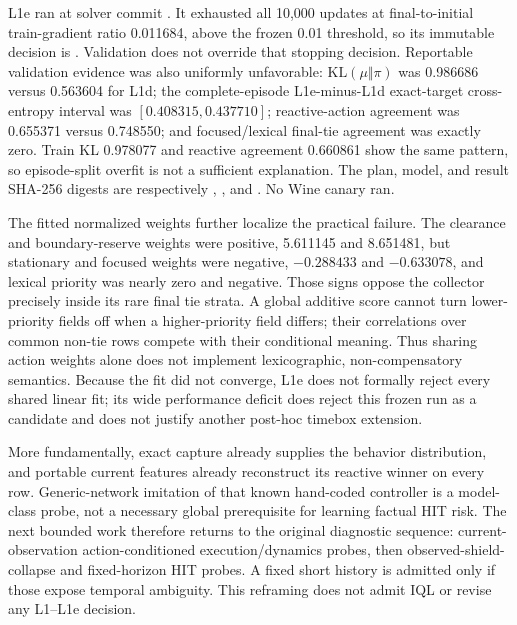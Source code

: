 \documentclass[11pt]{article}
\begin{document}
L1e ran at solver commit
.  It exhausted all 10,000
updates at final-to-initial train-gradient ratio 0.011684, above the frozen
0.01 threshold, so its immutable decision is
.  Validation
does not override that stopping decision.  Reportable validation evidence was
also uniformly unfavorable: $\mathrm{KL}(\mu\Vert\pi)$ was 0.986686 versus
0.563604 for L1d; the complete-episode L1e-minus-L1d exact-target
cross-entropy interval was $[0.408315,0.437710]$; reactive-action agreement was
0.655371 versus 0.748550; and focused/lexical final-tie agreement was exactly
zero.  Train KL 0.978077 and reactive agreement 0.660861 show the same pattern,
so episode-split overfit is not a sufficient explanation.  The plan, model,
and result SHA-256 digests are respectively
,
,
and
.
No Wine canary ran.

The fitted normalized weights further localize the practical failure.  The
clearance and boundary-reserve weights were positive, 5.611145 and 8.651481,
but stationary and focused weights were negative, $-0.288433$ and $-0.633078$,
and lexical priority was nearly zero and negative.  Those signs oppose the
collector precisely inside its rare final tie strata.  A global additive score
cannot turn lower-priority fields off when a higher-priority field differs;
their correlations over common non-tie rows compete with their conditional
meaning.  Thus sharing action weights alone does not implement lexicographic,
non-compensatory semantics.  Because the fit did not converge, L1e does not
formally reject every shared linear fit; its wide performance deficit does
reject this frozen run as a candidate and does not justify another post-hoc
timebox extension.

More fundamentally, exact capture already supplies the behavior distribution,
and portable current features already reconstruct its reactive winner on every
row.  Generic-network imitation of that known hand-coded controller is a
model-class probe, not a necessary global prerequisite for learning factual
HIT risk.  The next bounded work therefore returns to the original diagnostic
sequence: current-observation action-conditioned execution/dynamics probes,
then observed-shield-collapse and fixed-horizon HIT probes.  A fixed short
history is admitted only if those expose temporal ambiguity.  This reframing
does not admit IQL or revise any L1--L1e decision.
\end{document}
